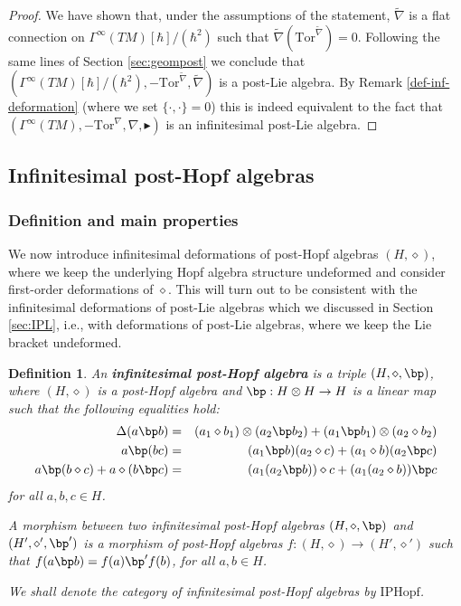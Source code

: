 \documentclass[10pt]{article}
\newtheorem {definition}[lemma] {Definition}
\theoremstyle{definition}
\newcommand{\bt}{\blacktriangleright}
\renewcommand{\wp}{\diamond}
\newcommand{\ot}{\otimes}
\begin{document}
\begin{proof}
We have shown that, under the assumptions of the statement, $\tilde{\nabla}$ is a flat connection on $\Gamma^\infty(TM)[\hbar]/(\hbar^2)$ such that $\tilde{\nabla}(\mathrm{Tor}^{\tilde{\nabla}})=0$. Following the same lines of Section \ref{sec:geompost} we conclude that $(\Gamma^\infty(TM)[\hbar]/(\hbar^2),-\mathrm{Tor}^{\tilde{\nabla}},\tilde{\nabla})$ is a post-Lie algebra. By Remark \ref{def-inf-deformation} (where we set $\{\cdot,\cdot\}=0$) this is indeed equivalent to the fact that $(\Gamma^\infty(TM),-\mathrm{Tor}^{\nabla},\nabla,\bt)$ is an infinitesimal post-Lie algebra.
\end{proof}

\subsection{Infinitesimal post-Hopf algebras}\label{sec:IPH}

\subsubsection{Definition and main properties}

We now introduce infinitesimal deformations of post-Hopf algebras $(H,\wp)$, where we keep the underlying Hopf algebra structure undeformed and consider first-order deformations of $\wp$. This will turn out to be consistent with the infinitesimal deformations of post-Lie algebras which we discussed in Section \ref{sec:IPL}, i.e., with deformations of post-Lie algebras, where we keep the Lie bracket undeformed.

\begin{definition}\label{def:infinitesimalpostHopf}
An \textbf{infinitesimal post-Hopf algebra} is a triple $(H,\wp, \bp)$, where $(H,\wp)$ is a post-Hopf algebra and $\bp:H\ot H\to H$ is a linear map such that the following equalities hold:
\begin{eqnarray}
\Delta(a\bp b)&=&(a_{1}\wp b_{1})\ot(a_{2}\bp b_{2})+(a_{1}\bp b_{1})\ot(a_{2}\wp b_{2})\label{deltalinear}\\
a\bp(bc)&=&%
    (a_{1}\bp b)(a_{2}\wp c)+(a_{1}\wp b)(a_{2}\bp c)\label{multiplicativity}\\
a\bp(b\wp c)+a\wp(b\bp c)&=& (a_{1}(a_{2}\bp b))\wp c+(a_{1}(a_{2}\wp b))\bp c \label{deformedassociativity}
\end{eqnarray}
for all $a,b,c \in H$.

A morphism between two infinitesimal post-Hopf algebras $(H,\wp,\bp)$ and $(H',\wp',\bp')$ is a morphism of post-Hopf algebras $f:(H,\wp)\to(H',\wp')$ such that $f(a\bp b)=f(a)\bp'f(b)$, for all $a,b\in H$.

We shall denote the category of infinitesimal post-Hopf algebras by $\mathrm{IPHopf}$. 
\end{definition}
\end{document}
